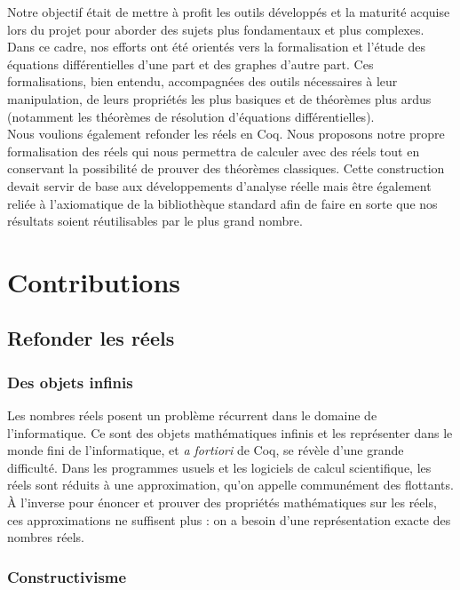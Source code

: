 \documentclass[11pt]{article}
\begin{document}
Notre objectif était de mettre à profit les outils développés et la maturité acquise lors du projet \coquille{} pour aborder des sujets plus fondamentaux et plus complexes. Dans ce cadre, nos efforts ont été orientés vers la formalisation et l'étude des équations différentielles d'une part et des graphes d'autre part. Ces formalisations, bien entendu, accompagnées des outils nécessaires à leur manipulation, de leurs propriétés les plus basiques et de théorèmes plus ardus (notamment les théorèmes de résolution d'équations différentielles).\\

Nous voulions également refonder les réels en Coq. Nous proposons notre propre formalisation des réels qui nous permettra de calculer avec des réels tout en conservant la possibilité de prouver des théorèmes classiques. Cette construction devait servir de base aux développements d'analyse réelle mais être également reliée à l'axiomatique de la bibliothèque standard afin de faire en sorte que nos résultats soient réutilisables par le plus grand nombre.

\section{Contributions}

\subsection{Refonder les réels}

\subsubsection{Des objets infinis}

Les nombres réels posent un problème récurrent dans le domaine de l'informatique. Ce sont des objets mathématiques infinis et les représenter dans le monde fini de l'informatique, et \emph{a fortiori} de Coq, se révèle d'une grande difficulté. Dans les programmes usuels et les logiciels de calcul scientifique, les réels sont réduits à une approximation, qu'on appelle communément des flottants. À l'inverse pour énoncer et prouver des propriétés mathématiques sur les réels, ces approximations ne suffisent plus : on a besoin d'une représentation exacte des nombres réels.

\subsubsection{Constructivisme}
\end{document}
